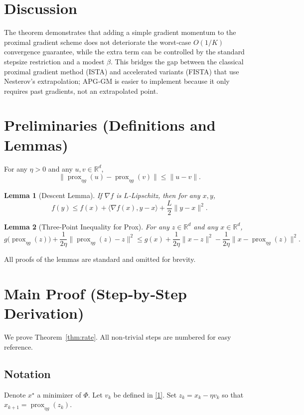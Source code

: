 \documentclass{article}
\newcommand{\prox}{\operatorname{prox}}
\newtheorem{lemma}{Lemma}
\begin{document}
\section*{Discussion}
The theorem demonstrates that adding a simple gradient momentum to the proximal gradient scheme does not deteriorate the worst‑case $O(1/K)$ convergence guarantee, while the extra term can be controlled by the standard stepsize restriction and a modest $\beta$. This bridges the gap between the classical proximal gradient method (ISTA) and accelerated variants (FISTA) that use Nesterov’s extrapolation; APG‑GM is easier to implement because it only requires past gradients, not an extrapolated point.

\newpage
\section*{Preliminaries (Definitions and Lemmas)}
\begin{definition}\label{def:prox}
For any $\eta>0$ and any $u,v\in\mathbb{R}^{d}$,
\[
\bigl\|\prox_{\eta g}(u)-\prox_{\eta g}(v)\bigr\|\le\|u-v\|.
\]
\end{definition}
\begin{lemma}[Descent Lemma]\label{lem:descent}
If $\nabla f$ is $L$‑Lipschitz, then for any $x,y$,
\[
f(y)\le f(x)+\langle\nabla f(x),y-x\rangle+\frac{L}{2}\|y-x\|^{2}.
\]
\end{lemma}
\begin{lemma}[Three‑Point Inequality for Prox]\label{lem:three}
For any $z\in\mathbb{R}^{d}$ and any $x\in\mathbb{R}^{d}$,
\[
g\bigl(\prox_{\eta g}(z)\bigr)+\frac{1}{2\eta}\bigl\|\prox_{\eta g}(z)-z\bigr\|^{2}
\le g(x)+\frac{1}{2\eta}\bigl\|x-z\bigr\|^{2}
-\frac{1}{2\eta}\bigl\|x-\prox_{\eta g}(z)\bigr\|^{2}.
\]
\end{lemma}
All proofs of the lemmas are standard and omitted for brevity.

\section*{Main Proof (Step‑by‑Step Derivation)}
We prove Theorem~\ref{thm:rate}.  
All non‑trivial steps are numbered for easy reference.

\subsection*{Notation}
Denote $x^{\star}$ a minimizer of $\Phi$.  
Let $v_{k}$ be defined in \eqref{1}.  
Set $z_{k}=x_{k}-\eta v_{k}$ so that $x_{k+1}= \prox_{\eta g}(z_{k})$.
\end{document}
